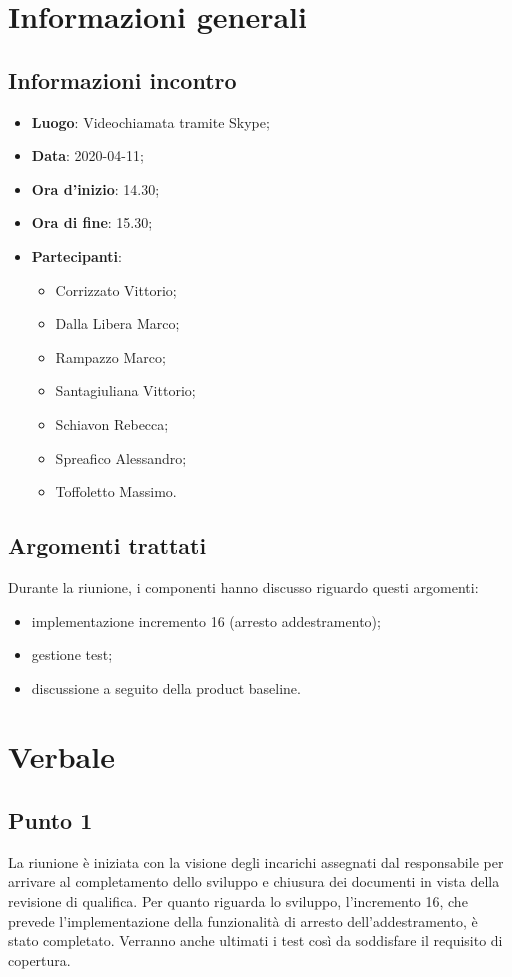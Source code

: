 \section{Informazioni generali}
    \subsection{Informazioni incontro}
        \begin{itemize}
            \item \textbf{Luogo}: Videochiamata tramite Skype;
            \item \textbf{Data}: 2020-04-11;
            \item \textbf{Ora d'inizio}: 14.30;
            \item \textbf{Ora di fine}: 15.30;
            \item \textbf{Partecipanti}: \begin{itemize}
                \item Corrizzato Vittorio;
                \item Dalla Libera Marco;
                \item Rampazzo Marco;
                \item Santagiuliana Vittorio;
                \item Schiavon Rebecca;
                \item Spreafico Alessandro;
                \item Toffoletto Massimo.
            \end{itemize}
        \end{itemize}
    \subsection{Argomenti trattati}
        Durante la riunione, i componenti hanno discusso riguardo questi argomenti:
        \begin{itemize}
            \item implementazione incremento 16 (arresto addestramento);
            \item gestione test;
            \item discussione a seguito della product baseline.
        \end{itemize}
\section{Verbale}
    \subsection{Punto 1}
        La riunione è iniziata con la visione degli incarichi assegnati dal responsabile per arrivare al completamento dello sviluppo e chiusura dei documenti in vista della revisione di qualifica. Per quanto riguarda lo sviluppo, l'incremento 16, che prevede l'implementazione della funzionalità di arresto dell'addestramento, è stato completato. Verranno anche ultimati i test così da soddisfare il requisito di copertura. 
